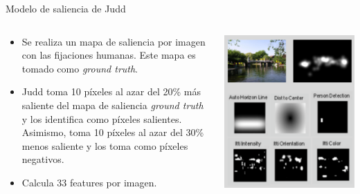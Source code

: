 \documentclass[compress]{beamer}
\begin{document}
\begin{frame}{Modelo de saliencia de Judd}
  \begin{columns}[T]
    \begin{column}{.57\textwidth}
        \begin{itemize}
        \item Se realiza un mapa de saliencia por imagen con las fijaciones humanas. Este mapa es tomado como \textit{ground truth}.
        \item Judd toma 10 píxeles al azar del 20\% más saliente del mapa de saliencia \textit{ground truth} y los identifica como píxeles salientes. Asimismo, toma 10 píxeles al azar del 30\% menos saliente y los toma como píxeles negativos.
        \item Calcula 33 features por imagen.
        \end{itemize}
    \end{column}
    \begin{column}{.4\textwidth}
        \begin{center}
        \includegraphics[width=\linewidth]{images/judd-features.png}
        \end{center}
        \vspace{0.25cm}
    \end{column}
  \end{columns}
\end{frame}
\end{document}
